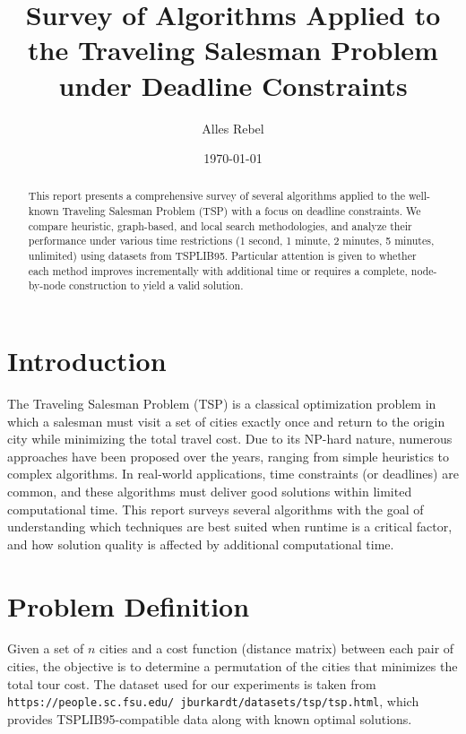 \documentclass[11pt]{article}
\title{Survey of Algorithms Applied to the Traveling Salesman Problem \\ under Deadline Constraints}
\author{Alles Rebel}
\date{\today}
\begin{document}
	\maketitle
	
	\begin{abstract}
		This report presents a comprehensive survey of several algorithms applied to the well-known Traveling Salesman Problem (TSP) with a focus on deadline constraints. We compare heuristic, graph-based, and local search methodologies, and analyze their performance under various time restrictions (1 second, 1 minute, 2 minutes, 5 minutes, unlimited) using datasets from TSPLIB95. Particular attention is given to whether each method improves incrementally with additional time or requires a complete, node-by-node construction to yield a valid solution.
	\end{abstract}
	
	\section{Introduction}
	The Traveling Salesman Problem (TSP) is a classical optimization problem in which a salesman must visit a set of cities exactly once and return to the origin city while minimizing the total travel cost. Due to its NP-hard nature, numerous approaches have been proposed over the years, ranging from simple heuristics to complex algorithms. In real-world applications, time constraints (or deadlines) are common, and these algorithms must deliver good solutions within limited computational time. This report surveys several algorithms with the goal of understanding which techniques are best suited when runtime is a critical factor, and how solution quality is affected by additional computational time.
	
	\section{Problem Definition}
	Given a set of $n$ cities and a cost function (distance matrix) between each pair of cities, the objective is to determine a permutation of the cities that minimizes the total tour cost. The dataset used for our experiments is taken from \texttt{https://people.sc.fsu.edu/~jburkardt/datasets/tsp/tsp.html}, which provides TSPLIB95-compatible data along with known optimal solutions.
	
\end{document}
